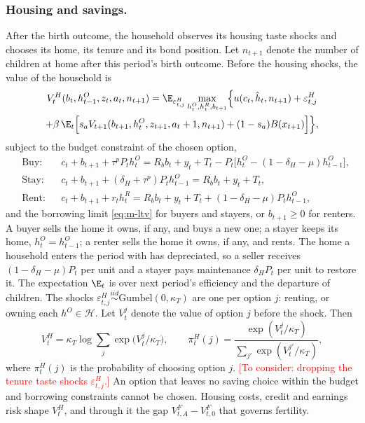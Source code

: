 \subsubsection*{Housing and savings.}
After the birth outcome, the household observes its housing taste shocks and
chooses its home, its tenure and its bond position. Let $n_{t+1}$ denote the
number of children at home after this period's birth outcome. Before the
housing shocks, the value of the household is
\begin{multline}
 V^H_t(b_t,h^O_{t-1},z_t,a_t,n_{t+1})
 =\E_{\varepsilon^H_{t,j}}\max_{h^O_t,h^R_t,b_{t+1}}
 \Bigl\{u(c_t,\hat h_t,n_{t+1})+\varepsilon^H_{t,j}\\
 +\beta\,\E_t\Bigl[s_aV_{t+1}(b_{t+1},h^O_t,z_{t+1},a_t+1,n_{t+1})
 +(1-s_a)B(x_{t+1})\Bigr]\Bigr\},
 \label{eq:m-vh}
\end{multline}
subject to the budget constraint of the chosen option,
\begin{equation}
\begin{aligned}
 &\text{Buy:}  && c_t+b_{t+1}+\tau^pP_th^O_t=R_bb_t+y_t+T_t-P_t\bigl[h^O_t-(1-\delta_H-\mu)h^O_{t-1}\bigr],\\
 &\text{Stay:} && c_t+b_{t+1}+(\delta_H+\tau^p)P_th^O_{t-1}=R_bb_t+y_t+T_t,\\
 &\text{Rent:} && c_t+b_{t+1}+r_th^R_t=R_bb_t+y_t+T_t+(1-\delta_H-\mu)P_th^O_{t-1},
\end{aligned}
 \label{eq:m-budget}
\end{equation}
and the borrowing limit \eqref{eq:m-ltv} for buyers and stayers, or
$b_{t+1}\ge0$ for renters. A buyer sells the home it owns, if any, and buys a
new one; a stayer keeps its home, $h^O_t=h^O_{t-1}$; a renter sells the home
it owns, if any, and rents. The home a household enters the period with has
depreciated, so a seller receives $(1-\delta_H-\mu)P_t$ per unit and a stayer
pays maintenance $\delta_HP_t$ per unit to restore it. The expectation $\E_t$ is over next period's efficiency and the
departure of children. The shocks
$\varepsilon^H_{t,j}\overset{iid}{\sim}\text{Gumbel}(0,\kappa_T)$ are one per
option $j$: renting, or owning each $h^O\in\mathcal H$. Let $V^j_t$ denote the
value of option $j$ before the shock. Then
\begin{equation}
 V^H_t=\kappa_T\log\sum_{j}\exp\bigl(V^j_t/\kappa_T\bigr),
 \qquad
 \pi^H_t(j)=\frac{\exp(V^j_t/\kappa_T)}{\sum_{j'}\exp(V^{j'}_t/\kappa_T)},
 \label{eq:m-tenure}
\end{equation}
where $\pi^H_t(j)$ is the probability of choosing option $j$. \textcolor{red}{[To consider: dropping the
tenure taste shocks $\varepsilon^H_{t,j}$.]} An option that
leaves no saving choice within the budget and borrowing constraints cannot be
chosen. Housing costs, credit and earnings risk shape $V^H_t$, and through it
the gap $V^F_{t,A}-V^F_{t,0}$ that governs fertility.

